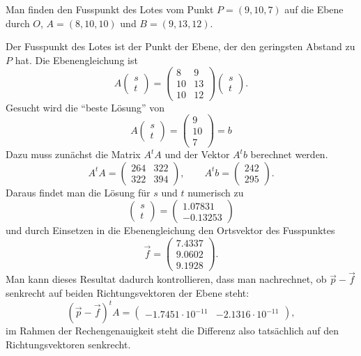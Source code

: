 \begin{beispiel}
Man finden den Fusspunkt des Lotes vom Punkt $P=(9,10,7)$ auf die Ebene
durch $O$, $A=(8,10,10)$ und $B=(9,13,12)$.

Der Fusspunkt des Lotes ist der Punkt der Ebene, der den geringsten
Abstand zu $P$ hat.
Die Ebenengleichung ist
\[
A\begin{pmatrix}s\\t\end{pmatrix}=
\begin{pmatrix}
 8& 9\\
10&13\\
10&12
\end{pmatrix}
\begin{pmatrix}s\\t\end{pmatrix}.
\]
Gesucht wird die ``beste Lösung'' von
\[
A\begin{pmatrix}s\\t\end{pmatrix}=\begin{pmatrix}9\\10\\7\end{pmatrix}=b
\]
Dazu muss zunächst die Matrix $A^tA$ und der Vektor $A^tb$
berechnet werden.
\[
A^tA=\begin{pmatrix}
264&322\\
322&394
\end{pmatrix}
,\qquad
A^tb=\begin{pmatrix}
242\\295
\end{pmatrix}.
\]
Daraus findet man die Lösung für $s$ und $t$ numerisch zu
\[
\begin{pmatrix}s\\t \end{pmatrix}
=
\begin{pmatrix}
   1.07831\\
  -0.13253
\end{pmatrix}
\]
und durch Einsetzen in die Ebenengleichung den Ortsvektor des Fusspunktes
\[
\vec f = \begin{pmatrix}
   7.4337\\
   9.0602\\
   9.1928
\end{pmatrix}.
\]
Man kann dieses Resultat dadurch kontrollieren, dass man nachrechnet, ob
$\vec p-\vec f$ senkrecht auf beiden Richtungsvektoren der Ebene
steht:
\[
(\vec p-\vec f)^tA=\begin{pmatrix}
  -1.7451\cdot10^{-11}&  -2.1316\cdot 10^{-11}
\end{pmatrix},
\]
im Rahmen der Rechengenauigkeit steht die Differenz also tatsächlich auf
den Richtungsvektoren senkrecht.
\end{beispiel}


